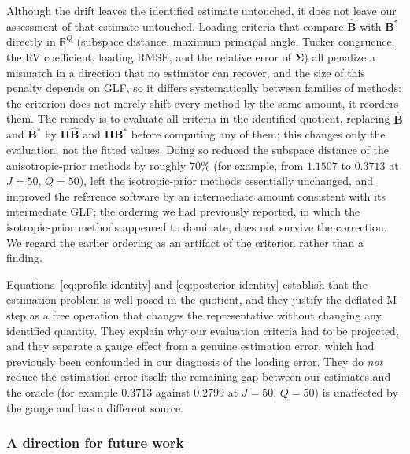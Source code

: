 Although the drift leaves the identified estimate untouched, it does not leave our assessment of that estimate untouched. Loading criteria that compare $\hat{\mathbf{B}}$ with $\mathbf{B}^\ast$ directly in $\mathbb{R}^Q$ (subspace distance, maximum principal angle, Tucker congruence, the RV coefficient, loading RMSE, and the relative error of $\bm{\Sigma}$) all penalize a mismatch in a direction that no estimator can recover, and the size of this penalty depends on GLF, so it differs systematically between families of methods: the criterion does not merely shift every method by the same amount, it reorders them. The remedy is to evaluate all criteria in the identified quotient, replacing $\hat{\mathbf{B}}$ and $\mathbf{B}^\ast$ by $\bm{\Pi}\hat{\mathbf{B}}$ and $\bm{\Pi}\mathbf{B}^\ast$ before computing any of them; this changes only the evaluation, not the fitted values. Doing so reduced the subspace distance of the anisotropic-prior methods by roughly $70\%$ (for example, from $1.1507$ to $0.3713$ at $J=50,\,Q=50$), left the isotropic-prior methods essentially unchanged, and improved the reference software by an intermediate amount consistent with its intermediate GLF; the ordering we had previously reported, in which the isotropic-prior methods appeared to dominate, does not survive the correction. We regard the earlier ordering as an artifact of the criterion rather than a finding.

Equations~\eqref{eq:profile-identity} and \eqref{eq:posterior-identity} establish that the estimation problem is well posed in the quotient, and they justify the deflated M-step as a free operation that changes the representative without changing any identified quantity. They explain why our evaluation criteria had to be projected, and they separate a gauge effect from a genuine estimation error, which had previously been confounded in our diagnosis of the loading error. They do \emph{not} reduce the estimation error itself: the remaining gap between our estimates and the oracle (for example $0.3713$ against $0.2799$ at $J=50,\,Q=50$) is unaffected by the gauge and has a different source.
 
\subsubsection{A direction for future work}
\label{subsubsec:direction-future-work}
 
